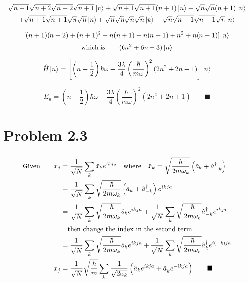 \documentclass{amsart}
\begin{document}
\begin{multline*}
\sqrt{n+1}\sqrt{n+2}\sqrt{n+2}\sqrt{n+1}\ket{n}+\sqrt{n+1}\sqrt{n+1}(n+1)\ket{n}+\sqrt{n}\sqrt{n}(n+1)\ket{n}\\+\sqrt{n+1}\sqrt{n+1}\sqrt{n}\sqrt{n}\ket{n}+\sqrt{n}\sqrt{n}\sqrt{n}\sqrt{n}\ket{n}+\sqrt{n}\sqrt{n-1}\sqrt{n-1}\sqrt{n}\ket{n}
\end{multline*}

\[[(n+1)(n+2)+(n+1)^2+n(n+1)+n(n+1)+n^2+n(n-1)]\ket{n}\]
\[\text{which is}\qquad(6n^2+6n+3)\ket{n}\]

\[\hat{H}\ket{n}=\left[\left(n+\frac{1}{2}\right)\hbar\omega+\frac{3\lambda}{4}\left(\frac{\hbar}{m\omega}\right)^2(2n^2+2n+1)\right]\ket{n}\]

\[E_n=\left(n+\frac{1}{2}\right)\hbar\omega+\frac{3\lambda}{4}\left(\frac{\hbar}{m\omega}\right)^2(2n^2+2n+1)\qquad\blacksquare\]

\section*{Problem 2.3}
\[\]
\begin{align*}
    \text{Given}\qquad x_j&=\frac{1}{\sqrt{N}}\sum_k \tilde{x}_k e^{ikja}\qq{where} \hat{x}_k=\sqrt{\frac{\hbar}{2m\omega_k}}\left(\hat{a}_k+\hat{a}^\dagger_{-k}\right)\\
    &=\frac{1}{\sqrt{N}}\sum_k \sqrt{\frac{\hbar}{2m\omega_k}}\left(\hat{a}_k+\hat{a}^\dagger_{-k}\right) e^{ikja}\\
    &=\frac{1}{\sqrt{N}}\sum_k \sqrt{\frac{\hbar}{2m\omega_k}}\hat{a}_k e^{ikja}+\frac{1}{\sqrt{N}}\sum_k \sqrt{\frac{\hbar}{2m\omega_k}}\hat{a}^\dagger_{-k} e^{ikja}\\
    &\qq{then change the index in the second term}\\
    &=\frac{1}{\sqrt{N}}\sum_k \sqrt{\frac{\hbar}{2m\omega_k}}\hat{a}_k e^{ikja}+\frac{1}{\sqrt{N}}\sum_k \sqrt{\frac{\hbar}{2m\omega_{k}}}\hat{a}^\dagger_{k} e^{i(-k)ja}\\
    x_j&=\frac{1}{\sqrt{N}}\sqrt{\frac{\hbar}{m}}\sum_k \frac{1}{\sqrt{2\omega_k}}\left(\hat{a}_k e^{ikja}+\hat{a}^\dagger_{k} e^{-ikja}\right)\qquad\blacksquare
\end{align*}
\end{document}
